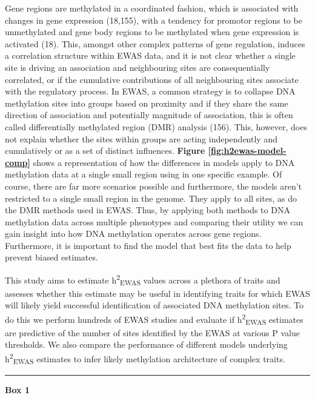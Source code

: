 \documentclass[11pt,oneside]{bristolthesis}
\begin{document}
Gene regions are methylated in a coordinated fashion, which is associated with changes in gene expression (18,155), with a tendency for promotor regions to be unmethylated and gene body regions to be methylated when gene expression is activated (18). This, amongst other complex patterns of gene regulation, induces a correlation structure within EWAS data, and it is not clear whether a single site is driving an association and neighbouring sites are consequentially correlated, or if the cumulative contributions of all neighbouring sites associate with the regulatory process. In EWAS, a common strategy is to collapse DNA methylation sites into groups based on proximity and if they share the same direction of association and potentially magnitude of association, this is often called differentially methylated region (DMR) analysis (156). This, however, does not explain whether the sites within groups are acting independently and cumulatively or as a set of distinct influences. \textbf{Figure \ref{fig:h2ewas-model-comp}} shows a representation of how the differences in models apply to DNA methylation data at a single small region using in one specific example. Of course, there are far more scenarios possible and furthermore, the models aren't restricted to a single small region in the genome. They apply to all sites, as do the DMR methods used in EWAS. Thus, by applying both methods to DNA methylation data across multiple phenotypes and comparing their utility we can gain insight into how DNA methylation operates across gene regions. Furthermore, it is important to find the model that best fits the data to help prevent biased estimates.

This study aims to estimate h\textsuperscript{2}\textsubscript{EWAS} values across a plethora of traits and assesses whether this estimate may be useful in identifying traits for which EWAS will likely yield successful identification of associated DNA methylation sites. To do this we perform hundreds of EWAS studies and evaluate if h\textsuperscript{2}\textsubscript{EWAS} estimates are predictive of the number of sites identified by the EWAS at various P value thresholds. We also compare the performance of different models underlying h\textsuperscript{2}\textsubscript{EWAS} estimates to infer likely methylation architecture of complex traits.
\begin{center}\rule{0.5\linewidth}{0.5pt}\end{center}

\textbf{Box 1}
\end{document}
